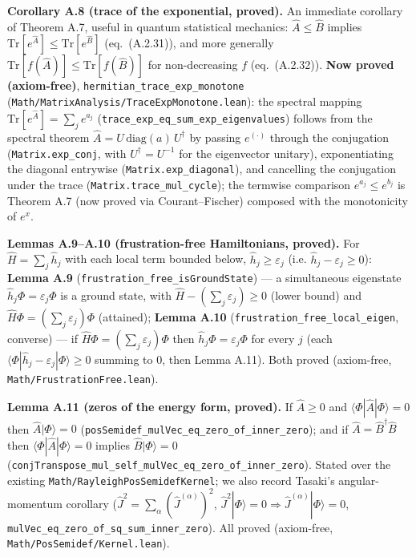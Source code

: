 \documentclass[a4paper,11pt]{article}
\begin{document}
\medskip\noindent\textbf{Corollary A.8 (trace of the exponential, proved).}  An
immediate corollary of Theorem A.7, useful in quantum statistical mechanics: $\hat A\le\hat B$
implies $\mathrm{Tr}[e^{\hat A}]\le\mathrm{Tr}[e^{\hat B}]$ (eq.~(A.2.31)), and more generally
$\mathrm{Tr}[f(\hat A)]\le\mathrm{Tr}[f(\hat B)]$ for non-decreasing $f$ (eq.~(A.2.32)).
\textbf{Now proved (axiom-free)}, \texttt{hermitian\_trace\_exp\_monotone}
(\texttt{Math/MatrixAnalysis/TraceExpMonotone.lean}): the spectral mapping
$\mathrm{Tr}[e^{\hat A}]=\sum_j e^{a_j}$ (\texttt{trace\_exp\_eq\_sum\_exp\_eigenvalues}) follows
from the spectral theorem $\hat A=U\,\mathrm{diag}(a)\,U^\dagger$ by passing $e^{(\cdot)}$ through
the conjugation (\texttt{Matrix.exp\_conj}, with $U^\dagger=U^{-1}$ for the eigenvector unitary),
exponentiating the diagonal entrywise (\texttt{Matrix.exp\_diagonal}), and cancelling the
conjugation under the trace (\texttt{Matrix.trace\_mul\_cycle}); the termwise comparison
$e^{a_j}\le e^{b_j}$ is Theorem A.7 (now proved via Courant--Fischer) composed with the
monotonicity of $e^x$.

\medskip\noindent\textbf{Lemmas A.9--A.10 (frustration-free Hamiltonians, proved).}  For
$\hat H=\sum_j\hat h_j$ with each local term bounded below, $\hat h_j\ge\varepsilon_j$ (i.e.
$\hat h_j-\varepsilon_j\ge0$): \textbf{Lemma A.9} (\texttt{frustration\_free\_isGroundState}) --- a
simultaneous eigenstate $\hat h_j\Phi=\varepsilon_j\Phi$ is a ground state, with
$\hat H-(\sum_j\varepsilon_j)\ge0$ (lower bound) and $\hat H\Phi=(\sum_j\varepsilon_j)\Phi$
(attained); \textbf{Lemma A.10} (\texttt{frustration\_free\_local\_eigen}, converse) --- if
$\hat H\Phi=(\sum_j\varepsilon_j)\Phi$ then $\hat h_j\Phi=\varepsilon_j\Phi$ for every $j$ (each
$\langle\Phi|\hat h_j-\varepsilon_j|\Phi\rangle\ge0$ summing to $0$, then Lemma A.11).  Both proved
(axiom-free, \texttt{Math/FrustrationFree.lean}).

\medskip\noindent\textbf{Lemma A.11 (zeros of the energy form, proved).}  If
$\hat A\ge0$ and $\langle\Phi|\hat A|\Phi\rangle=0$ then $\hat A|\Phi\rangle=0$
(\texttt{posSemidef\_mulVec\_eq\_zero\_of\_inner\_zero}); and if $\hat A=\hat B^\dagger\hat B$ then
$\langle\Phi|\hat A|\Phi\rangle=0$ implies $\hat B|\Phi\rangle=0$
(\texttt{conjTranspose\_mul\_self\_mulVec\_eq\_zero\_of\_inner\_zero}).  Stated over the existing
\texttt{Math/RayleighPosSemidefKernel}; we also record Tasaki's angular-momentum corollary
($\hat J^2=\sum_\alpha(\hat J^{(\alpha)})^2$, $\hat J^2|\Phi\rangle=0\Rightarrow\hat J^{(\alpha)}|\Phi\rangle=0$,
\texttt{mulVec\_eq\_zero\_of\_sq\_sum\_inner\_zero}).  All proved (axiom-free,
\texttt{Math/PosSemidef/Kernel.lean}).
\end{document}
